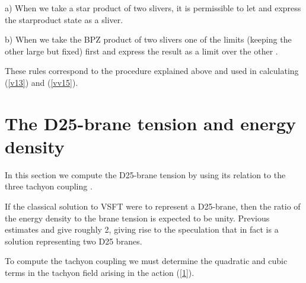 \documentclass[a4paper,12pt]{article}
\begin{document}
a) When we take a star product of two slivers, it is permissible to
let \coordHE{} and express the starproduct state as a sliver.

b) When we take the BPZ product of two slivers one of the
limits \coordHE{} (keeping the other \coordHE{} large but fixed) first and
express the result as a limit over the other \coordHE{}.

These rules  correspond to the procedure explained above and used in 
calculating (\ref{v13}) and (\ref{vv15}).

\vspace*{.8cm}

\section{The D25-brane tension and  energy density}

In this section we compute the D25-brane tension by using its relation
to the three tachyon coupling \coordHE{} \cite{s,gs}.

If the classical solution \coordHE{} to VSFT were to represent a
D25-brane, then the ratio of the energy density \coordHE{} to
the brane tension \coordHE{} is expected to be unity. Previous
estimates
\cite{rsz1} and \cite{hk,hm} give roughly 2, giving rise to the speculation
that
\coordHE{} in fact is a solution representing two D25 branes.

To compute the tachyon coupling we must determine the quadratic and cubic
terms in the tachyon field arising in the action (\ref{1}).
\end{document}
